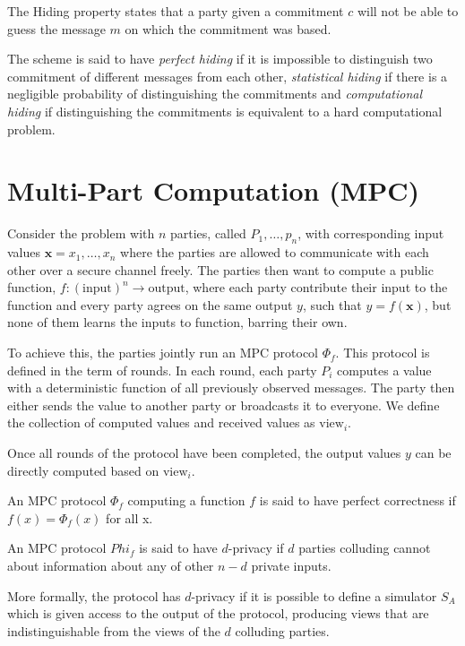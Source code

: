 \begin{definition}
The Hiding property states that a party given a commitment $c$ will not be able
to guess the message $m$ on which the commitment was based.

The scheme is said to have \textit{perfect hiding} if it is impossible to
distinguish two commitment of different messages from each other,
\textit{statistical hiding} if there is a negligible probability of
distinguishing the commitments and \textit{computational hiding} if
distinguishing the commitments is equivalent to a hard computational problem.
\end{definition}


\section{Multi-Part Computation (MPC)}
\label{sec:background:mpc}
Consider the problem with $n$ parties, called $P_{1}, \dots, p_{n}$, with
corresponding input values $\textbf{x} = x_{1}, \dots, x_{n}$ where the parties
are allowed to communicate with each other over a secure channel freely.
The parties then want to compute a public function,
$f : (\text{input})^{n} \rightarrow \text{output}$, where each party contribute
their input to the function and every party agrees on the same output
$y$, such that $y = f(\textbf{x})$, but none of them learns the inputs to
function, barring their own.

To achieve this, the parties jointly run an MPC protocol $\Phi_{f}$. This protocol
is defined in the term of rounds.
In each round, each party $P_{i}$ computes a
value with a deterministic function of all previously observed messages.
The party then either sends the value to another party or broadcasts it to everyone.
We define the collection of
computed values and received values as $\text{view}_{i}$.

Once all rounds of the protocol have been completed, the output values $y$ can be
directly computed based on $\text{view}_{i}$.


\begin{definition}
  \label{def:mpc:correctness}
  An MPC protocol $\Phi_{f}$ computing a function $f$ is said to have perfect
  correctness if $f(x) = \Phi_{f}(x)$ for all x.
\end{definition}

\begin{definition}[d-Privacy]
\label{def:mpc:d-privacy}
  An MPC protocol $Phi_{f}$ is said to have $d$-privacy if $d$ parties colluding
  cannot about information about any of other $n-d$ private inputs.

  More formally, the protocol has $d$-privacy if it is possible to define a
  simulator $S_{A}$ which is given access to the output of the protocol,
  producing views that are indistinguishable from the views of the $d$ colluding
  parties.
\end{definition}

